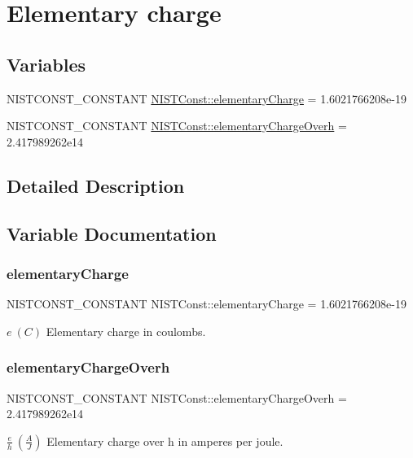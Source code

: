 \hypertarget{group___n_i_s_t_const-_elementary_charge}{}\section{Elementary charge}
\label{group___n_i_s_t_const-_elementary_charge}
\subsection*{Variables}
\begin{DoxyCompactItemize}
\item 
N\+I\+S\+T\+C\+O\+N\+S\+T\+\_\+\+C\+O\+N\+S\+T\+A\+NT \mbox{\hyperlink{group___n_i_s_t_const-_elementary_charge_ga8685ffddeaed87687d2ee0539b4625de}{N\+I\+S\+T\+Const\+::elementary\+Charge}} = 1.\+6021766208e-\/19
\item 
N\+I\+S\+T\+C\+O\+N\+S\+T\+\_\+\+C\+O\+N\+S\+T\+A\+NT \mbox{\hyperlink{group___n_i_s_t_const-_elementary_charge_gae14d69d686990378677cd8072ce9873b}{N\+I\+S\+T\+Const\+::elementary\+Charge\+Overh}} = 2.\+417989262e14
\end{DoxyCompactItemize}


\subsection{Detailed Description}


\subsection{Variable Documentation}
\mbox{\label{group___n_i_s_t_const-_elementary_charge_ga8685ffddeaed87687d2ee0539b4625de}} 
\subsubsection{\texorpdfstring{elementary\+Charge}{elementaryCharge}}
{\footnotesize\ttfamily N\+I\+S\+T\+C\+O\+N\+S\+T\+\_\+\+C\+O\+N\+S\+T\+A\+NT N\+I\+S\+T\+Const\+::elementary\+Charge = 1.\+6021766208e-\/19}

$e \ (C)$ Elementary charge in coulombs. \mbox{\label{group___n_i_s_t_const-_elementary_charge_gae14d69d686990378677cd8072ce9873b}} 
\subsubsection{\texorpdfstring{elementary\+Charge\+Overh}{elementaryChargeOverh}}
{\footnotesize\ttfamily N\+I\+S\+T\+C\+O\+N\+S\+T\+\_\+\+C\+O\+N\+S\+T\+A\+NT N\+I\+S\+T\+Const\+::elementary\+Charge\+Overh = 2.\+417989262e14}

$\frac{e}{h} \ (\frac{A}{J})$ Elementary charge over h in amperes per joule. 